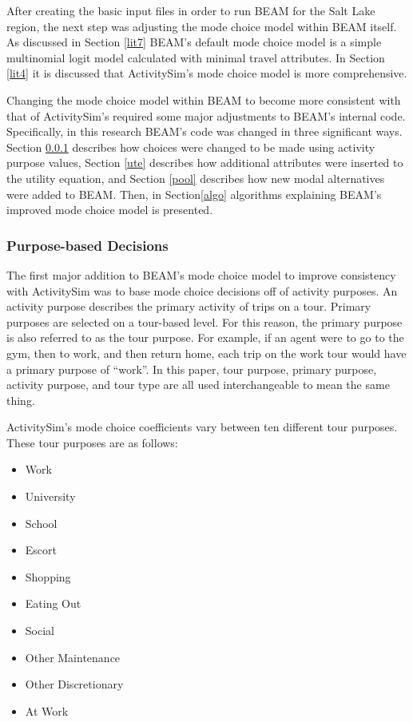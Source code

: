 \documentclass[3p, authoryear, review]{elsarticle} %
\providecommand{\tightlist}{%
  \setlength{\itemsep}{0pt}\setlength{\parskip}{0pt}}
\begin{document}
After creating the basic input files in order to run BEAM for the Salt Lake region, the next step was adjusting the mode choice model within BEAM itself. As discussed in Section \ref{lit7} BEAM's default mode choice model is a simple multinomial logit model calculated with minimal travel attributes. In Section \ref{lit4} it is discussed that ActivitySim's mode choice model is more comprehensive.

Changing the mode choice model within BEAM to become more consistent with that of ActivitySim's required some major adjustments to BEAM's internal code. Specifically, in this research BEAM's code was changed in three significant ways. Section \ref{purp} describes how choices were changed to be made using activity purpose values, Section \ref{ute} describes how additional attributes were inserted to the utility equation, and Section \ref{pool} describes how new modal alternatives were added to BEAM. Then, in Section\ref{algo} algorithms explaining BEAM's improved mode choice model is presented.

\hypertarget{purp}{%
\subsubsection{Purpose-based Decisions}\label{purp}}

The first major addition to BEAM's mode choice model to improve consistency with ActivitySim was to base mode choice decisions off of activity purposes. An activity purpose describes the primary activity of trips on a tour. Primary purposes are selected on a tour-based level. For this reason, the primary purpose is also referred to as the tour purpose. For example, if an agent were to go to the gym, then to work, and then return home, each trip on the work tour would have a primary purpose of ``work''. In this paper, tour purpose, primary purpose, activity purpose, and tour type are all used interchangeable to mean the same thing.

ActivitySim's mode choice coefficients vary between ten different tour purposes. These tour purposes are as follows:

\begin{itemize}
\tightlist
\item
  Work
\item
  University
\item
  School
\item
  Escort
\item
  Shopping
\item
  Eating Out
\item
  Social
\item
  Other Maintenance
\item
  Other Discretionary
\item
  At Work
\end{itemize}
\end{document}

